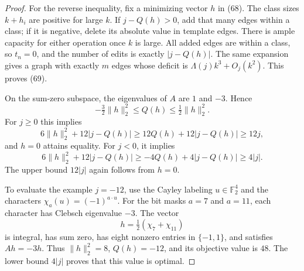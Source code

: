 \documentclass[11pt]{amsart}
\theoremstyle{definition}
\theoremstyle{remark}
\begin{document}
\begin{proof}
For the reverse inequality, fix a minimizing vector $h$ in (68). The
class sizes $k+h_i$ are positive for large $k$. If $j-Q(h)>0$, add that
many edges within a class; if it is negative, delete its absolute value
in template edges. There is ample capacity for either operation once
$k$ is large. All added edges are within a class, so $t_n=0$, and the
number of edits is exactly $|j-Q(h)|$. The same expansion gives a graph
with exactly $m$ edges whose deficit is $\Lambda(j)k^3+O_j(k^2)$. This
proves (69).

On the sum-zero subspace, the eigenvalues of $A$ are $1$ and $-3$. Hence
\[
 -\tfrac32\lVert h\rVert_2^2\leq Q(h)\leq\tfrac12\lVert h\rVert_2^2.
\]
For $j\geq0$ this implies
\[
 6\lVert h\rVert_2^2+12|j-Q(h)|
 \geq12Q(h)+12|j-Q(h)|\geq12j,
\]
and $h=0$ attains equality. For $j<0$, it implies
\[
 6\lVert h\rVert_2^2+12|j-Q(h)|
 \geq-4Q(h)+4|j-Q(h)|\geq4|j|.
\]
The upper bound $12|j|$ again follows from $h=0$.

To evaluate the example $j=-12$, use the Cayley labeling
$u\in\mathbb F_2^4$ and the characters $\chi_a(u)=(-1)^{a\cdot u}$.
For the bit masks $a=7$ and $a=11$, each character has Clebsch eigenvalue
$-3$. The vector
\[
 h=\tfrac12(\chi_7+\chi_{11})
\]
is integral, has sum zero, has eight nonzero entries in $\{-1,1\}$, and
satisfies $Ah=-3h$. Thus $\lVert h\rVert_2^2=8$, $Q(h)=-12$, and its
objective value is $48$. The lower bound $4|j|$ proves that this value is
optimal.
\end{proof}
\end{document}
